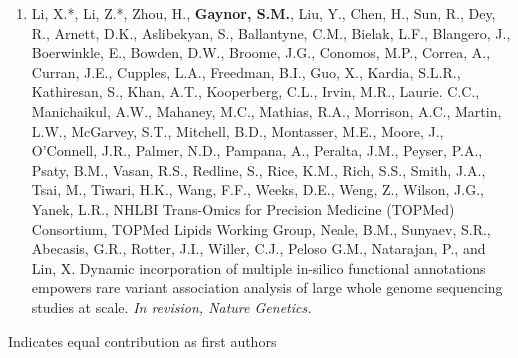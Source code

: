 \documentclass[10pt]{article}
\begin{document}
\begin{enumerate}
\item Li, X.*, Li, Z.*, Zhou, H., \textbf{Gaynor, S.M.}, Liu, Y., Chen, H., Sun, R., Dey, R., Arnett, D.K., Aslibekyan, S., Ballantyne, C.M., Bielak, L.F., Blangero, J., Boerwinkle, E., Bowden, D.W., Broome, J.G., Conomos, M.P., Correa, A., Curran, J.E., Cupples, L.A., Freedman, B.I.,  Guo, X., Kardia, S.L.R., Kathiresan, S., Khan, A.T.,  Kooperberg, C.L., Irvin, M.R., Laurie. C.C., Manichaikul, A.W., Mahaney, M.C., Mathias, R.A., Morrison, A.C., Martin, L.W., McGarvey, S.T., Mitchell, B.D., Montasser, M.E.,  Moore, J.,  O’Connell, J.R., Palmer, N.D., Pampana, A.,  Peralta, J.M.,  Peyser, P.A.,  Psaty, B.M., Vasan, R.S., Redline, S., Rice, K.M., Rich, S.S., Smith, J.A.,  Tsai, M., Tiwari, H.K., Wang, F.F., Weeks, D.E., Weng, Z., Wilson, J.G., Yanek, L.R., NHLBI Trans-Omics for Precision Medicine (TOPMed) Consortium, TOPMed Lipids Working Group, Neale, B.M., Sunyaev, S.R., Abecasis, G.R.,  Rotter, J.I.,  Willer, C.J., Peloso G.M., Natarajan, P., and Lin, X. Dynamic incorporation of multiple in-silico functional annotations empowers rare variant association analysis of large whole genome sequencing studies at scale. \textit{In revision, Nature Genetics.}\\
\end{enumerate}

\indent \indent  * Indicates equal contribution as first authors\\
\end{document}
